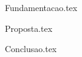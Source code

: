 \documentclass[openright]{normas-utf-tex} %
\begin{document}
\listadefiguras %
\listadetabelas %
\listadequadros %
\listadesiglas %
\listadesimbolos %

\sumario %


%
%
%
%


\setcounter{page}{12}
\setcounter{table}{0} \renewcommand{\thetable}{\arabic{table}}



 {Fundamentacao.tex}

 {Proposta.tex}

 {Conclusao.tex}
\end{document}
